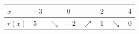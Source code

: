 \documentclass[border=.4pt]{standalone}
\begin{document}
\color{ink}\begin{tabular}{|>{\centering\arraybackslash}m{1.7cm}|>{\centering\arraybackslash}m{1.25cm}|>{\centering\arraybackslash}m{1.25cm}|>{\centering\arraybackslash}m{1.25cm}|>{\centering\arraybackslash}m{1.25cm}|>{\centering\arraybackslash}m{1.25cm}|>{\centering\arraybackslash}m{1.25cm}|>{\centering\arraybackslash}m{1.25cm}|}\hline
\cellcolor{head}$x$ & \cellcolor{head}$-3$ & \cellcolor{head} & \cellcolor{head}$0$ & \cellcolor{head} & \cellcolor{head}$2$ & \cellcolor{head} & \cellcolor{head}$4$ \\ \hline
\cellcolor{head}$r(x)$ & $5$ & \color{focus}\large $\searrow$ & $-2$ & \color{focus}\large $\nearrow$ & $1$ & \color{focus}\large $\searrow$ & $0$ \\ \hline\end{tabular}
\end{document}
